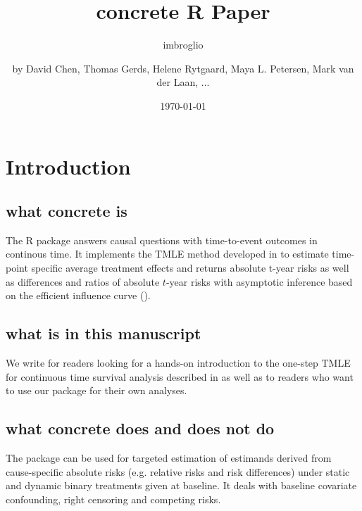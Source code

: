 \documentclass{report}
\author{imbroglio}
\date{\today}
\title{}
\newcommand{\1}{\ensuremath{\mathbf{1}}}
\begin{document}
\title{concrete R Paper}
\subtitle{}
\author{by David Chen, Thomas Gerds, Helene Rytgaard, Maya L. Petersen, Mark van der Laan, ...}

\maketitle


\section{Introduction}
\label{intro}
\subsection{what concrete is}
\label{sec:orgc1aae34}

The R package  answers causal questions with time-to-event outcomes in continous time. It implements the TMLE method developed in \cite{rytgaard_one-step_2021} to estimate time-point specific average treatment effects and returns absolute t-year risks as well as differences and ratios of absolute \(t\)-year risks with asymptotic inference based on the efficient influence curve (\cite{bickel_efficient_1998}).

\subsection{what is in this manuscript}
\label{sec:org04e2d45}

We write for readers looking for a hands-on introduction to the one-step TMLE for
continuous time survival analysis described in \cite{rytgaard_one-step_2021} as well as to readers
who want to use our package for their own analyses.

\subsection{what concrete does and does not do}
\label{sec:org0732428}
The package can be used for targeted estimation of estimands derived from cause-specific absolute risks (e.g. relative risks and risk differences) under static and dynamic binary treatments given at baseline. It deals with baseline covariate confounding, right censoring and competing risks.
\end{document}

